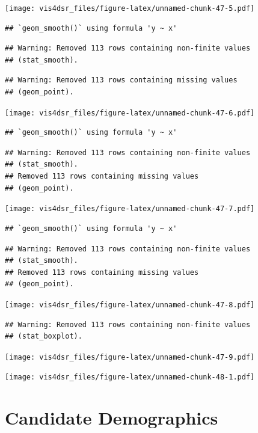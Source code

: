 \documentclass[
]{krantz}
\begin{document}
\texttt{[image: vis4dsr\_files/figure-latex/unnamed-chunk-47-5.pdf]}

\begin{verbatim}
## `geom_smooth()` using formula 'y ~ x'
\end{verbatim}

\begin{verbatim}
## Warning: Removed 113 rows containing non-finite values
## (stat_smooth).
\end{verbatim}

\begin{verbatim}
## Warning: Removed 113 rows containing missing values
## (geom_point).
\end{verbatim}

\texttt{[image: vis4dsr\_files/figure-latex/unnamed-chunk-47-6.pdf]}

\begin{verbatim}
## `geom_smooth()` using formula 'y ~ x'
\end{verbatim}

\begin{verbatim}
## Warning: Removed 113 rows containing non-finite values
## (stat_smooth).
## Removed 113 rows containing missing values
## (geom_point).
\end{verbatim}

\texttt{[image: vis4dsr\_files/figure-latex/unnamed-chunk-47-7.pdf]}

\begin{verbatim}
## `geom_smooth()` using formula 'y ~ x'
\end{verbatim}

\begin{verbatim}
## Warning: Removed 113 rows containing non-finite values
## (stat_smooth).
## Removed 113 rows containing missing values
## (geom_point).
\end{verbatim}

\texttt{[image: vis4dsr\_files/figure-latex/unnamed-chunk-47-8.pdf]}

\begin{verbatim}
## Warning: Removed 113 rows containing non-finite values
## (stat_boxplot).
\end{verbatim}

\texttt{[image: vis4dsr\_files/figure-latex/unnamed-chunk-47-9.pdf]}

\texttt{[image: vis4dsr\_files/figure-latex/unnamed-chunk-48-1.pdf]}

\hypertarget{candidate-demographics}{%
\section*{Candidate Demographics}\label{candidate-demographics}}
\end{document}
